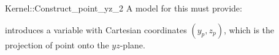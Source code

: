 \begin{ccRefFunctionObjectConcept}{Kernel::Construct_point_yz_2}
A model for this must provide:



            {introduces a variable with Cartesian coordinates $(y_p, z_p)$, 
             which is the projection of point  onto the $yz$-plane.}

\end{ccRefFunctionObjectConcept}
